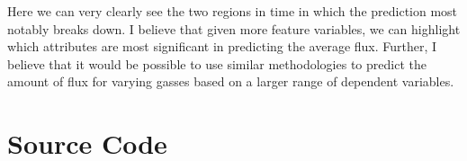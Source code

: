 \documentclass{article}
\begin{document}
Here we can very clearly see the two regions in time in which the prediction most notably breaks down. I believe that given more feature variables, we can highlight which attributes are most significant in predicting the average flux. Further, I believe that it would be possible to use similar methodologies to predict the amount of flux for varying gasses based on a larger range of dependent variables.

\section{Source Code}

\end{document}
